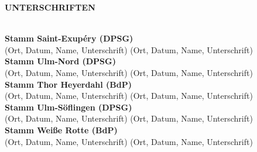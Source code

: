 \begin{Large}
    \textbf{UNTERSCHRIFTEN}
\end{Large}
\\

\textbf{Stamm Saint-Exupéry (DPSG)}
\\
(Ort, Datum, Name, Unterschrift) (Ort, Datum, Name, Unterschrift)
\\

\textbf{Stamm Ulm-Nord (DPSG)}
\\
(Ort, Datum, Name, Unterschrift) (Ort, Datum, Name, Unterschrift)
\\

\textbf{Stamm Thor Heyerdahl (BdP)}
\\
(Ort, Datum, Name, Unterschrift) (Ort, Datum, Name, Unterschrift)
\\

\textbf{Stamm Ulm-Söflingen (DPSG)}
\\
(Ort, Datum, Name, Unterschrift) (Ort, Datum, Name, Unterschrift)
\\

\textbf{Stamm Weiße Rotte (BdP)}
\\
(Ort, Datum, Name, Unterschrift) (Ort, Datum, Name, Unterschrift)
